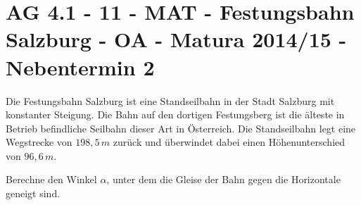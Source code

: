 \section{AG 4.1 - 11 - MAT - Festungsbahn Salzburg - OA - Matura 2014/15 - Nebentermin 2}

\begin{beispiel}[AG 4.1]{1} %
				Die Festungsbahn Salzburg ist eine Standseilbahn in der Stadt Salzburg mit konstanter Steigung. Die Bahn auf den dortigen Festungsberg ist die älteste in Betrieb befindliche Seilbahn dieser Art in Österreich. Die Standseilbahn legt eine Wegstrecke von $198,5\,m$ zurück und überwindet dabei einen Höhenunterschied von $96,6\,m$.
				
				Berechne den Winkel $\alpha$, unter dem die Gleise der Bahn gegen die Horizontale geneigt sind.\\
				
\end{beispiel}